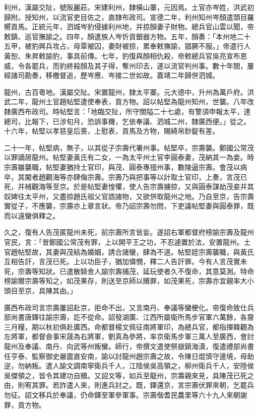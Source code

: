 \begin{pinyinscope}
利州，漢屬交阯，號阪麗莊。宋建利州，隸橫山寨，元因焉。土官亦岑姓，洪武初歸附。授知州，以流官吏目佐之，直隸布政司。宣德二年，利州知州岑顏遣頭目羅嚮貢馬。正統元年，泗城岑豹侵據利州地，并掠顏妻子財物。總兵官山雲以聞，帝敕鎮、巡官撫諭之。四年，顏遣族人岑忻貢銀器方物。五年，顏奏：「本州地二十五甲，被豹興兵攻占，母覃被囚，妻財被掠，累奉敕撫諭，猖獗不服。」帝遣行人黃恕、朱昇敕諭豹，事具前傳。七年，豹復與顏相仇殺，帝敕總兵官吳亮宣布恩威，令各罷兵，而豹終殺顏及其子得，奪州印去，遂以流官判州事。數十年間，屢經諸司勘奏，移檄督追，歷岑應、岑接二世如故。嘉靖二年歸併泗城。

龍州，古百粵地。漢屬交阯。宋置龍州，隸太平寨。元大德中，升州為萬戶府。洪武二年，龍州土官趙帖堅遣使奉表，貢方物。詔以帖堅為龍州知州，世襲。八年改隸廣西布政司。時帖堅言：「地臨交阯，所守關隘二十七處，有警須申報太平，達總司，比報下，已涉旬月，恐誤事機，乞依奉議、泗城二州，隸廣西便。」從之。十六年，帖堅以孝慈皇后喪，上慰表，貢馬及方物，賜綺帛鈔錠有差。

二十一年，帖堅病，無子，以其從子宗壽代署州事。帖堅卒，宗壽襲。鄭國公常茂以罪謫居龍州。帖堅妻黃氏有二女，一為太平州土官李圓泰妻，茂納其一為妾。時宗壽雖襲職，帖堅妻猶持土官印，與茂、圓泰專擅州事，數陵逼宗壽。會茂以病卒，其閽者趙觀海等亦肆侮宗壽。宗壽乃與把事等以計取土官印，上奏，言茂已死，并械觀海等至京。於是帖堅妻惶懼，使人告宗壽擄掠，又與圓泰謀劫茂妾并其奴婢往太平州，又盡掠趙氏祖父官誥諸物，又欲併取龍州之地。乃自至京，告宗壽實從子，不應襲，宗壽亦上章言狀。帝乃詔宗壽勿問，下吏議帖堅妻與圓泰罪，既而以遠蠻俱釋之。

久之，復有人告茂匿龍州未死，前宗壽所言皆妄。遂詔右軍都督府榜諭宗壽及龍州官民，言：「昔鄭國公常茂有罪，上以開平王之功，不忍遽置於法，安置龍州。土官趙帖堅故，其妻與茂結為婚姻，誘合諸蠻，肆為不道。帖堅姪宗壽襲職，與黃氏互相告訐，言茂已死。上以功臣子，猶加憐憫，釋二人告訐罪。今有人言茂實未死，宗壽等知狀。已遣散騎舍人諭宗壽捕茂，延玩使者久不復命，其意莫測。特命榜諭爾宗壽等知之，如茂果存，則送至京師以贖罪，如茂果死，宗壽亦宜親率大小頭目至京，具陳其由。」

廣西布政司言宗壽屢詔赴京，拒命不出，又言南丹、奉議等蠻梗化。帝復命致仕兵部尚書唐鐸往諭宗壽，訖不從命。詔發湖廣、江西所屬衛所馬步官軍六萬餘，各齎三月糧，期以秋初俱赴廣西。命都督楊文佩征南將軍印，為總兵官，都指揮韓觀為左將軍，都督僉事宋晟為右將軍，劉真為參將，率京衛馬步軍三萬人至廣西，會討龍州及奉議、南丹、向武等州叛蠻。師行，帝撰文遣使祭嶽鎮海瀆，復遣禮部尚書任亨泰、監察御史嚴震直安南，諭以討龍州趙宗壽之故，令陳日焜慎守邊境，毋助逆，勿納叛。遣人諭文調南寧衛兵千人，江陰侯吳高領之，柳州衛兵千人，安陸侯吳傑領之，皆令其建功自贖。又詔文等，如兵至龍州，宗壽親來見，具陳茂已死之由，則宥其罪。若詐遣人來，則進兵討之。既，鐸還京，言宗壽伏罪來朝，乞罷兵勿征。詔文移兵於奉議，仍命鐸至軍參軍事。宗壽偕耆民農里等六十九人來朝謝罪，貢方物。


\end{pinyinscope}
